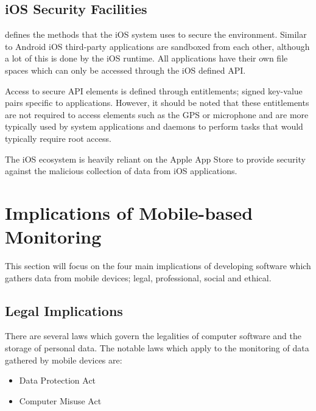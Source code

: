 \documentclass[12pt, a4paper]{article}
\begin{document}
\nocite{lockheimer2012android}

\subsection{iOS Security Facilities}
\cite{apple2012security} defines the methods that the iOS system uses to secure
the environment. Similar to Android iOS third-party applications are sandboxed 
from each other, although a lot of this is done by the iOS runtime. All
applications have their own file spaces which can only be accessed through the
iOS defined API.

Access to secure API elements is defined through entitlements; signed key-value
pairs specific to applications. However, it should be noted that these
entitlements are not required to access elements such as the GPS or microphone
and are more typically used by system applications and daemons to perform tasks
that would typically require root access.

The iOS ecosystem is heavily reliant on the Apple App
Store to provide security against the malicious
collection of data from iOS applications.





\newpage
\section{Implications of Mobile-based Monitoring}

This section will focus on the four main implications of developing software
which gathers data from mobile devices; legal, professional, social and
ethical.


\subsection{Legal Implications}

There are several laws which govern the legalities of computer software and the
storage of personal data. The notable laws which apply to the monitoring of
data gathered by mobile devices are:

\begin{itemize}
\item Data Protection Act\cite{dpa1998}
\item Computer Misuse Act\cite{cma1990}
\end{itemize}
\end{document}

